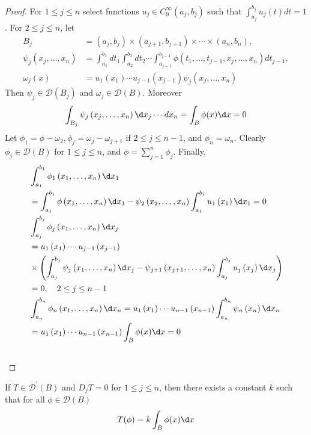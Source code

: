 \begin{proof}
  For $1 \leq j \leq n$ select functions $u_j \in C_0^{\infty}\left(a_j, b_j\right)$ such that $\int_{a_j}^{b_j} u_j(t) d t=1$. For $2 \leq j \leq n$, let
  \[
  \begin{aligned}
  B_j & =\left(a_j, b_j\right) \times\left(a_{j+1}, b_{j+1}\right) \times \cdots \times\left(a_n, b_n\right), \\
  \psi_j\left(x_j, \ldots, x_n\right) & =\int_{a_1}^{b_1} d t_1 \int_{a_2}^{b_2} d t_2 \cdots \int_{a_{j-1}}^{b_{j-1}} \phi\left(t_1, \ldots, t_{j-1}, x_j, \ldots, x_n\right) d t_{j-1}, \\
  \omega_j(x) & =u_1\left(x_1\right) \cdots u_{j-1}\left(x_{j-1}\right) \psi_j\left(x_j, \ldots, x_n\right)
  \end{aligned}
  \]
  Then $\psi_j \in \mathscr{D}\left(B_j\right)$ and $\omega_j \in \mathscr{D}(B)$. Moreover
  \[
  \int_{B_j} \psi_j\left(x_j, \ldots, x_n\right) \d x_j \cdots d x_n=\int_B \phi(x) \d x=0
  \]
  Let $\phi_1=\phi-\omega_2, \phi_j=\omega_j-\omega_{j+1}$ if $2 \leq j \leq n-1$, and $\phi_n=\omega_n$. Clearly $\phi_j \in \mathscr{D}(B)$ for $1 \leq j \leq n$, and $\phi=\sum_{j=1}^n \phi_j$. Finally,
  \[
  \begin{aligned}
  & \int_{a_1}^{b_1} \phi_1\left(x_1, \ldots, x_n\right) \d x_1 \\
  & =\int_{a_1}^{b_1} \phi\left(x_1, \ldots, x_n\right) \d x_1-\psi_2\left(x_2, \ldots, x_n\right) \int_{a_1}^{b_1} u_1\left(x_1\right) \d x_1=0 \\
  & \int_{a_j}^{b_j} \phi_j\left(x_1, \ldots, x_n\right) \d x_j \\
  & =u_1\left(x_1\right) \cdots u_{j-1}\left(x_{j-1}\right) \\
  & \times\left(\int_{a_j}^{b_j} \psi_j\left(x_1, \ldots, x_n\right) \d x_j-\psi_{j+1}\left(x_{j+1}, \ldots, x_n\right) \int_{a_j}^{b_j} u_j\left(x_j\right) \d x_j\right) \\
  & =0, \quad 2 \leq j \leq n-1 \\
  & \int_{a_n}^{b_n} \phi_n\left(x_1, \ldots, x_n\right) \d x_n=u_1\left(x_1\right) \cdots u_{n-1}\left(x_{n-1}\right) \int_{a_n}^{b_n} \psi_n\left(x_n\right) \d x_n \\
  & =u_1\left(x_1\right) \cdots u_{n-1}\left(x_{n-1}\right) \int_B \phi(x) \d x=0 \\
  &
  \end{aligned}
  \]
\end{proof}


\begin{corollary}
  If $T \in \mathscr{D}^{\prime}(B)$ and $D_j T=0$ for $1 \leq j \leq n$, then there exists a constant $k$ such that for all $\phi \in \mathscr{D}(B)$
  \[
  T(\phi)=k \int_B \phi(x) \d x
  \]
\end{corollary}

